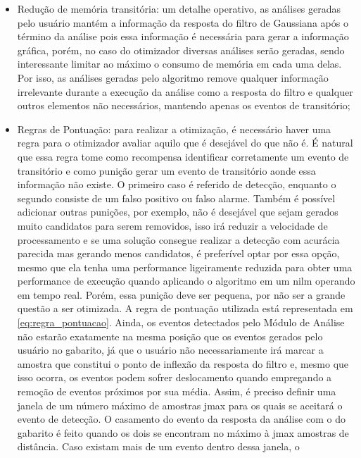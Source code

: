 \begin{itemize}

\item Redução de memória transitória: um detalhe operativo, as
análises geradas pelo usuário mantém a informação da resposta do
filtro de Gaussiana após o término da análise pois essa informação é
necessária para gerar a informação gráfica, porém, no caso do
otimizador diversas análises serão geradas, sendo interessante limitar
ao máximo o consumo de memória em cada uma delas. Por isso, as
análises geradas pelo algoritmo remove qualquer informação irrelevante
durante a execução da análise como a resposta do filtro e qualquer
outros elementos não necessários, mantendo apenas os eventos de
transitório;

\item Regras de Pontuação: para realizar a otimização, é necessário
haver uma regra para o otimizador avaliar aquilo que é desejável do
que não é. É natural que essa regra tome como recompensa identificar
corretamente um evento de transitório e como punição gerar um evento
de transitório aonde essa informação não existe. O primeiro caso é
referido de detecção, enquanto o segundo consiste de um falso positivo
ou falso alarme. Também é possível adicionar outras punições, por
exemplo, não é desejável que sejam gerados muito candidatos para serem
removidos, isso irá reduzir a velocidade de processamento e se uma
solução consegue realizar a detecção com acurácia parecida mas gerando
menos candidatos, é preferível optar por essa opção, mesmo que ela
tenha uma performance ligeiramente reduzida para obter uma performance
de execução quando aplicando o algoritmo em um \gls{nilm} operando em
tempo real. Porém, essa punição deve ser pequena, por não ser a
grande questão a ser otimizada. A regra de pontuação utilizada está
representada em \ref{eq:regra_pontuacao}. Ainda, os eventos detectados
pelo Módulo de Análise não estarão exatamente na mesma posição que os
eventos gerados pelo usuário no gabarito, já que o usuário não
necessariamente irá marcar a amostra que constitui o ponto de inflexão da
resposta do filtro e, mesmo que isso ocorra, os eventos podem sofrer
deslocamento quando empregando a remoção de eventos próximos por sua
média. Assim, é preciso definir uma janela de um número máximo de
amostras \acs{jmax} para os quais se aceitará o evento de detecção. O
casamento do evento da resposta da análise com o do gabarito é feito
quando os dois se encontram no máximo à \acs{jmax} amostras de
distância. Caso existam mais de um evento dentro dessa janela, o

\end{itemize}
